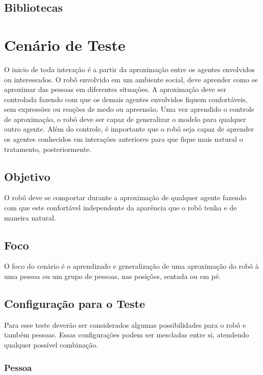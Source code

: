 \subsection{Bibliotecas}
\label{sec:bibliotecas}

\section{Cenário de Teste} %
\label{sec:cenario}
O inicio de toda interação é a partir da aproximação entre os agentes envolvidos ou interessados. O robô envolvido em um ambiente social, deve aprender como se aproximar das pessoas em diferentes situações. A aproximação deve ser controlada fazendo com que os demais agentes envolvidos fiquem confortáveis, sem expressões ou reações de medo ou apreensão. Uma vez aprendido o controle de aproximação, o robô deve ser capaz de generalizar o modelo para qualquer outro agente. Além do controle, é importante que o robô seja capaz de aprender os agentes conhecidos em interações anteriores para que fique mais natural o tratamento, posteriormente.

\subsection{Objetivo}

O robô deve se comportar durante a aproximação de qualquer agente fazendo com que este confortável independente da aparência que o robô tenha e de maneira natural.

\subsection{Foco}

O foco do cenário é o aprendizado e generalização de uma aproximação do robô à uma pessoa ou um grupo de pessoas, nas posições, sentada ou em pé.

\subsection{Configuração para o Teste}

Para esse teste deverão ser considerados algumas possibilidades para o robô e também pessoas. Essas configurações podem ser mescladas entre si, atendendo qualquer possível combinação.

\subsubsection{Pessoa}

